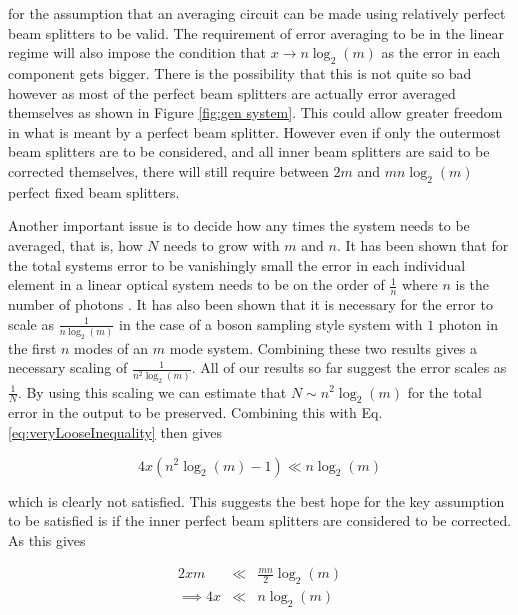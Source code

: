 \documentclass[aps,pra,twocolumn,superscriptaddress,numerical]{revtex4-1}
\begin{document}
		
		for the assumption that an averaging circuit can be made using relatively perfect beam splitters to be valid. The requirement of error averaging to be in the linear regime will also impose the condition that $x\rightarrow n\log_{2}\left(m\right)$ as the error in each component gets bigger. There is the possibility that this is not quite so bad however as most of the perfect beam splitters are actually error averaged themselves as shown in Figure \ref{fig:gen system}. This could allow greater freedom in what is meant by a perfect beam splitter. However even if only	the outermost beam splitters are to be considered, and all inner beam splitters are said to be corrected themselves, there will still require between $2m$ and $mn\log_{2}\left(m\right)$ perfect fixed beam splitters.
		
		Another important issue is to decide how any times the system needs	to be averaged, that is, how $N$ needs to grow with $m$ and $n$. It has been shown that for the total systems error to be vanishingly small the error in each individual element in a linear optical system	needs to be on the order of $\frac{1}{n}$ where $n$ is the number of photons \cite{arkhipov2014}. It has also been shown that it is	necessary for the error to scale as $\frac{1}{n\log_{2}\left(m\right)}$	\cite{Boson} in the case of a boson sampling style system with $1$ photon in the first $n$ modes of an $m$ mode system. Combining these	two results gives a necessary scaling of $\frac{1}{n^{2}\log_{2}\left(m\right)}$. All of our results so far suggest the error scales as $\frac{1}{N}$. By using this scaling we can estimate that $N\sim n^{2}\log_{2}\left(m\right)$ for the total error in the output to be preserved. Combining this with Eq. \ref{eq:veryLooseInequality} then gives 
		
		\begin{equation}
			4x\left(n^{2}\log_{2}\left(m\right)-1\right)\ll n\log_{2}\left(m\right)\label{eq:LooseInequality}
		\end{equation}
		
		
		which is clearly not satisfied. This suggests the best hope for the key assumption to be satisfied is if the inner perfect beam splitters are considered to be corrected. As this gives
			
		\begin{eqnarray}
			2xm & \ll & \frac{mn}{2}\log_{2}\left(m\right)\nonumber \\
			\implies4x & \ll & n\log_{2}\left(m\right)\label{eq:aBetterInequality}
		\end{eqnarray}
		
\end{document}
